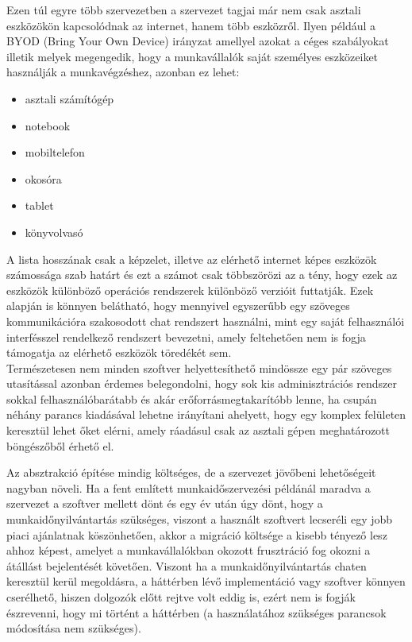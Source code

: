 Ezen túl egyre több szervezetben a szervezet tagjai már nem csak asztali eszközökön kapcsolódnak az internet, hanem több eszközről. Ilyen például a BYOD (Bring Your Own Device) irányzat amellyel azokat a céges szabályokat illetik melyek megengedik, hogy a munkavállalók saját személyes eszközeiket használják a munkavégzéshez, azonban ez lehet:

\begin{itemize}
  \item asztali számítógép
  \item notebook
  \item mobiltelefon
  \item okosóra
  \item tablet
  \item könyvolvasó
\end{itemize}

A lista hosszának csak a képzelet, illetve az elérhető internet képes eszközök számossága szab határt és ezt a számot csak többszörözi az a tény, hogy ezek az eszközök különböző operációs rendszerek különböző verzióit futtatják. Ezek alapján is könnyen belátható, hogy mennyivel egyszerűbb egy szöveges kommunikációra szakosodott chat rendszert használni, mint egy saját felhasználói interfésszel rendelkező rendszert bevezetni, amely feltehetően nem is fogja támogatja az elérhető eszközök töredékét sem.\\
\newline
Természetesen nem minden szoftver helyettesíthető mindössze egy pár szöveges utasítással azonban érdemes belegondolni, hogy sok kis adminisztrációs rendszer sokkal felhasználóbarátabb és akár erőforrásmegtakarítóbb lenne, ha csupán néhány parancs kiadásával lehetne irányítani ahelyett, hogy egy komplex felületen keresztül lehet őket elérni, amely ráadásul csak az asztali gépen meghatározott böngészőből érhető el.

Az absztrakció építése mindig költséges, de a szervezet jövőbeni lehetőségeit nagyban növeli. Ha a fent említett munkaidőszervezési példánál maradva a szervezet a szoftver mellett dönt és egy év után úgy dönt, hogy a munkaidőnyilvántartás szükséges, viszont a használt szoftvert lecseréli egy jobb piaci ajánlatnak köszönhetően, akkor a migráció költsége a kisebb tényező lesz ahhoz képest, amelyet a munkavállalókban okozott frusztráció fog okozni a átállást bejelentését követően. Viszont ha a munkaidőnyilvántartás chaten keresztül kerül megoldásra, a háttérben lévő implementáció vagy szoftver könnyen cserélhető, hiszen dolgozók előtt rejtve volt eddig is, ezért nem is fogják észrevenni, hogy mi történt a háttérben (a használatához szükséges parancsok módosítása nem szükséges).

